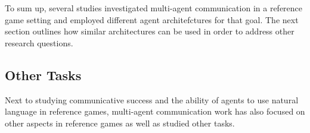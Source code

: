 
To sum up, several studies investigated multi-agent communication in a reference game setting and employed different agent architefctures for that goal. The next section outlines how similar architectures can be used in order to address other research questions.

\subsection{Other Tasks}

Next to studying communicative success and the ability of agents to use natural language in reference games, multi-agent communication work has also focused on other aspects in reference games as well as studied other tasks.
 
